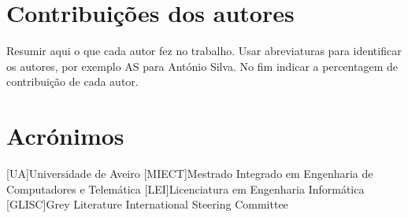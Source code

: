 \documentclass{report}
\begin{document}
\chapter*{Contribuições dos autores}
Resumir aqui o que cada autor fez no trabalho.
Usar abreviaturas para identificar os autores,
por exemplo AS para António Silva.
No fim indicar a percentagem de contribuição de cada autor.

\chapter*{Acrónimos}
\begin{acronym}
[UA]{Universidade de Aveiro}
[MIECT]{Mestrado Integrado em Engenharia de Computadores e Telemática}
[LEI]{Licenciatura em Engenharia Informática}
[GLISC]{Grey Literature International Steering Committee}
\end{acronym}


\printbibliography
\end{document}
